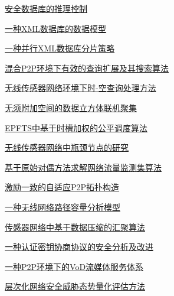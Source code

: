\documentclass[a4paper]{article}
\begin{document}
\href{http://www.jos.org.cn/ch/reader/download_pdf.aspx?file_no=20060411&year_id=2006&quarter_id=4&falg=1}{安全数据库的推理控制}

\href{http://www.jos.org.cn/ch/reader/download_pdf.aspx?file_no=20060412&year_id=2006&quarter_id=4&falg=1}{一种XML数据库的数据模型}

\href{http://www.jos.org.cn/ch/reader/download_pdf.aspx?file_no=20060413&year_id=2006&quarter_id=4&falg=1}{一种并行XML数据库分片策略}

\href{http://www.jos.org.cn/ch/reader/download_pdf.aspx?file_no=20060414&year_id=2006&quarter_id=4&falg=1}{混合P2P环境下有效的查询扩展及其搜索算法}

\href{http://www.jos.org.cn/ch/reader/download_pdf.aspx?file_no=20060415&year_id=2006&quarter_id=4&falg=1}{无线传感器网络环境下时-空查询处理方法}

\href{http://www.jos.org.cn/ch/reader/download_pdf.aspx?file_no=20060416&year_id=2006&quarter_id=4&falg=1}{无须附加空间的数据立方体联机聚集}

\href{http://www.jos.org.cn/ch/reader/download_pdf.aspx?file_no=20060418&year_id=2006&quarter_id=4&falg=1}{EPFTS中基于时槽加权的公平调度算法}

\href{http://www.jos.org.cn/ch/reader/download_pdf.aspx?file_no=20060419&year_id=2006&quarter_id=4&falg=1}{无线传感器网络中瓶颈节点的研究}

\href{http://www.jos.org.cn/ch/reader/download_pdf.aspx?file_no=20060420&year_id=2006&quarter_id=4&falg=1}{基于原始对偶方法求解网络流量监测集算法}

\href{http://www.jos.org.cn/ch/reader/download_pdf.aspx?file_no=20060421&year_id=2006&quarter_id=4&falg=1}{激励一致的自适应P2P拓扑构造}

\href{http://www.jos.org.cn/ch/reader/download_pdf.aspx?file_no=20060422&year_id=2006&quarter_id=4&falg=1}{一种无线网络路径容量分析模型}

\href{http://www.jos.org.cn/ch/reader/download_pdf.aspx?file_no=20060423&year_id=2006&quarter_id=4&falg=1}{传感器网络中基于数据压缩的汇聚算法}

\href{http://www.jos.org.cn/ch/reader/download_pdf.aspx?file_no=20060424&year_id=2006&quarter_id=4&falg=1}{一种认证密钥协商协议的安全分析及改进}

\href{http://www.jos.org.cn/ch/reader/download_pdf.aspx?file_no=20060425&year_id=2006&quarter_id=4&falg=1}{一种P2P环境下的VoD流媒体服务体系}

\href{http://www.jos.org.cn/ch/reader/download_pdf.aspx?file_no=20060426&year_id=2006&quarter_id=4&falg=1}{层次化网络安全威胁态势量化评估方法}
\end{document}
